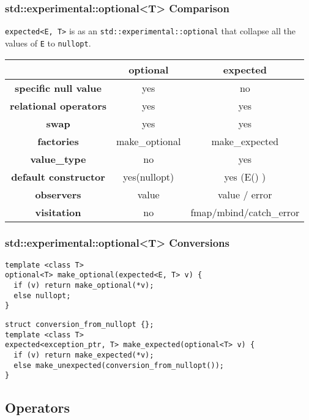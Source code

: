 \documentclass[xcolor=dvipsnames]{beamer}
\newcommand{\cpp}[1]{\lstinline{#1}}
\begin{document}
\begin{frame}[fragile]
\frametitle{std::experimental::optional<T> Comparison}

\cpp{expected<E, T>} is as an \cpp{std::experimental::optional} that collapse all the values of \cpp{E} to \cpp{nullopt}.

\begin{tabular}{|c|c|c|}
\hline
                    & \textbf{optional} & \textbf{expected}  \\
\hline
\textbf{specific null value} & yes & no \\
\hline
\textbf{relational operators} & yes & yes \\
\hline
\textbf{swap} & yes & yes \\
\hline
\textbf{factories} & make\_optional & make\_expected  \\
\hline
\textbf{value\_type} & no & yes  \\
\hline
\textbf{default constructor} & yes(nullopt)  & yes (E() )  \\
\hline
\textbf{observers} & value  & value / error   \\
\hline
\textbf{visitation} & no & fmap/mbind/catch\_error  \\
\hline
\end{tabular}
\end{frame}

\begin{frame}[fragile]
\frametitle{std::experimental::optional<T> Conversions}
\begin{lstlisting}
template <class T>
optional<T> make_optional(expected<E, T> v) {
  if (v) return make_optional(*v);
  else nullopt;
}
\end{lstlisting}

\begin{lstlisting}
struct conversion_from_nullopt {};
template <class T>
expected<exception_ptr, T> make_expected(optional<T> v) {
  if (v) return make_expected(*v);
  else make_unexpected(conversion_from_nullopt());
}
\end{lstlisting}
\end{frame}

\subsection{Operators}
\end{document}
